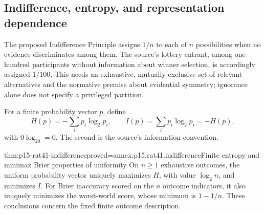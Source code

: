 \subsection{Indifference, entropy, and representation dependence}

The proposed Indifference Principle assigns \(1/n\) to each of \(n\)
possibilities when no evidence discriminates among them. The source's
lottery entrant, among one hundred participants without information
about winner selection, is accordingly assigned \(1/100\). This needs
an exhaustive, mutually exclusive set of relevant alternatives and the
normative premise about evidential symmetry; ignorance alone does not
specify a privileged partition.

For a finite probability vector \(p\), define
\[
       H(p)=-\sum_i p_i\log_2p_i,
       \qquad I(p)=\sum_i p_i\log_2p_i=-H(p),
\]
with \(0\log_20=0\). The second is the source's information convention.

\begin{hbtheorem}{thm:p15-rat41-indifference}{proved=annex:p15.rat41.indifference}{Finite entropy and minimax Brier properties of uniformity}
On \(n\geq1\) exhaustive outcomes, the uniform probability vector
uniquely maximizes \(H\), with value \(\log_2n\), and minimizes \(I\).
For Brier inaccuracy scored on the \(n\) outcome indicators, it also
uniquely minimizes the worst-world score, whose minimum is \(1-1/n\).
These conclusions concern the fixed finite outcome description.
\end{hbtheorem}

